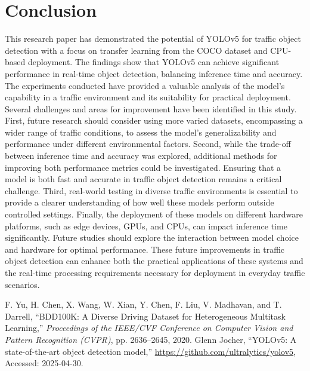 \documentclass[11pt]{article}
\begin{document}
\section{Conclusion}
This research paper has demonstrated the potential of YOLOv5 for traffic object detection with a focus on transfer learning from the COCO dataset and CPU-based deployment. The findings show that YOLOv5 can achieve significant performance in real-time object detection, balancing inference time and accuracy. The experiments conducted have provided a valuable analysis of the model's capability in a traffic environment and its suitability for practical deployment. Several challenges and areas for improvement have been identified in this study. First, future research should consider using more varied datasets, encompassing a wider range of traffic conditions, to assess the model's generalizability and performance under different environmental factors. Second, while the trade-off between inference time and accuracy was explored, additional methods for improving both performance metrics could be investigated. Ensuring that a model is both fast and accurate in traffic object detection remains a critical challenge. Third, real-world testing in diverse traffic environments is essential to provide a clearer understanding of how well these models perform outside controlled settings. Finally, the deployment of these models on different hardware platforms, such as edge devices, GPUs, and CPUs, can impact inference time significantly. Future studies should explore the interaction between model choice and hardware for optimal performance. These future improvements in traffic object detection can enhance both the practical applications of these systems and the real-time processing requirements necessary for deployment in everyday traffic scenarios.


  
\begin{thebibliography}{9}

F. Yu, H. Chen, X. Wang, W. Xian, Y. Chen, F. Liu, V. Madhavan, and T. Darrell, 
``BDD100K: A Diverse Driving Dataset for Heterogeneous Multitask Learning,'' 
\textit{Proceedings of the IEEE/CVF Conference on Computer Vision and Pattern Recognition (CVPR)}, 
pp. 2636--2645, 2020.
Glenn Jocher, 
``YOLOv5: A state-of-the-art object detection model,''
\url{https://github.com/ultralytics/yolov5}, 
Accessed: 2025-04-30.

\end{thebibliography}
\end{document}
